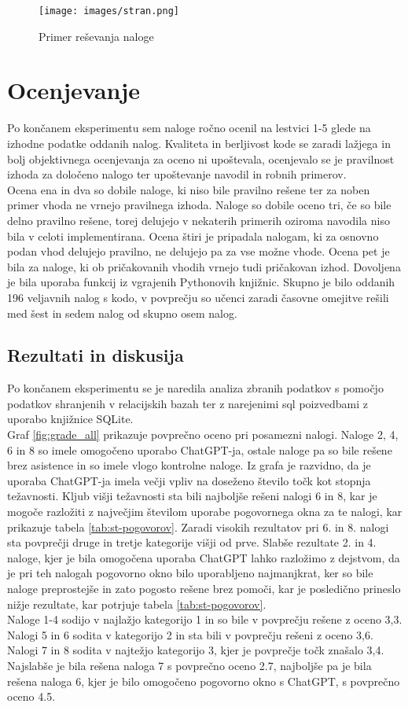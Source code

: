 \documentclass[a4paper,12pt,openright]{book}
\begin{document}
\begin{figure}[H]
    \centering
    \texttt{[image: images/stran.png]}
    \caption{Primer reševanja naloge}
    \label{fig:stran}
\end{figure}


\section{Ocenjevanje}
Po končanem eksperimentu sem naloge ročno ocenil na lestvici 1-5 glede na izhodne podatke oddanih nalog. Kvaliteta in berljivost kode se zaradi lažjega in bolj objektivnega ocenjevanja za oceno ni upoštevala, ocenjevalo se je pravilnost izhoda za določeno nalogo ter upoštevanje navodil in robnih primerov. \\
Ocena ena in dva so dobile naloge, ki niso bile pravilno rešene ter za noben primer vhoda ne vrnejo pravilnega izhoda. Naloge so dobile oceno tri, če so bile delno pravilno rešene, torej delujejo v nekaterih primerih oziroma navodila niso bila v celoti implementirana. Ocena štiri je pripadala nalogam, ki za osnovno podan vhod delujejo pravilno, ne delujejo pa za vse možne vhode. Ocena pet je bila za naloge, ki ob pričakovanih vhodih vrnejo tudi pričakovan izhod. Dovoljena je bila uporaba funkcij iz vgrajenih Pythonovih knjižnic.  Skupno je bilo oddanih 196 veljavnih nalog s kodo, v povprečju so učenci zaradi časovne omejitve rešili med šest in sedem nalog od skupno osem nalog. 
\subsection{Rezultati in diskusija}
Po končanem eksperimentu se je naredila analiza zbranih podatkov s pomočjo podatkov shranjenih v relacijskih bazah ter z narejenimi sql poizvedbami z uporabo knjižnice SQLite. \\
Graf \ref{fig:grade_all} prikazuje povprečno oceno pri posamezni nalogi. Naloge 2, 4, 6 in 8 so imele omogočeno uporabo ChatGPT-ja, ostale naloge pa so bile rešene brez asistence in so imele vlogo kontrolne naloge. Iz grafa je razvidno, da je uporaba ChatGPT-ja imela večji vpliv na doseženo število točk kot stopnja težavnosti. Kljub višji težavnosti sta bili najboljše rešeni nalogi 6 in 8, kar je mogoče razložiti z največjim številom uporabe pogovornega okna za te nalogi, kar prikazuje tabela \ref{tab:st-pogovorov}. Zaradi visokih rezultatov pri 6. in 8. nalogi sta povprečji druge in tretje kategorije višji od prve.
Slabše rezultate 2. in 4. naloge, kjer je bila omogočena uporaba ChatGPT lahko razložimo z dejstvom, da je pri teh nalogah pogovorno okno bilo uporabljeno najmanjkrat, ker so bile naloge preprostejše in zato pogosto rešene brez pomoči, kar je posledično prineslo nižje rezultate, kar potrjuje tabela \ref{tab:st-pogovorov}. 
\\ Naloge 1-4 sodijo v najlažjo kategorijo 1 in so bile v povprečju rešene z oceno 3,3. Nalogi 5 in 6 sodita v kategorijo 2 in sta bili v povprečju rešeni z oceno 3,6. Nalogi 7 in 8 sodita v najtežjo kategorijo 3, kjer je povprečje točk znašalo 3,4. Najslabše je bila rešena naloga 7 s povprečno oceno 2.7, najboljše pa je bila rešena naloga 6, kjer je bilo omogočeno pogovorno okno s ChatGPT, s povprečno oceno 4.5.
\end{document}
